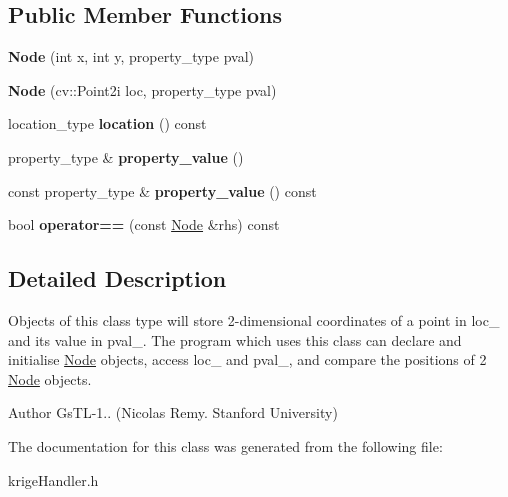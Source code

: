 \subsection*{Public Member Functions}
\begin{DoxyCompactItemize}
\item 
\mbox{\label{classkrige__ce_1_1Node_ab7cf6ac84866959c63ac5da4b4dfb19c}} 
{\bfseries Node} (int x, int y, property\+\_\+type pval)
\item 
\mbox{\label{classkrige__ce_1_1Node_a7a02fb3b97ae4f7472ddf44730dbe788}} 
{\bfseries Node} (cv\+::\+Point2i loc, property\+\_\+type pval)
\item 
\mbox{\label{classkrige__ce_1_1Node_a108c775d615eef2f14f63e2c603c4e60}} 
location\+\_\+type {\bfseries location} () const
\item 
\mbox{\label{classkrige__ce_1_1Node_a2418e7e73c58f5288747419d564de75c}} 
property\+\_\+type \& {\bfseries property\+\_\+value} ()
\item 
\mbox{\label{classkrige__ce_1_1Node_a05fb31d493d66fe8699948681049e03b}} 
const property\+\_\+type \& {\bfseries property\+\_\+value} () const
\item 
\mbox{\label{classkrige__ce_1_1Node_a65b916a73c69103e5ae98b9a2fc8a63c}} 
bool {\bfseries operator==} (const \hyperlink{classkrige__ce_1_1Node}{Node} \&rhs) const
\end{DoxyCompactItemize}


\subsection{Detailed Description}
Objects of this class type will store 2-\/dimensional coordinates of a point in loc\+\_\+ and its value in pval\+\_\+. The program which uses this class can declare and initialise \hyperlink{classkrige__ce_1_1Node}{Node} objects, access loc\+\_\+ and pval\+\_\+, and compare the positions of 2 \hyperlink{classkrige__ce_1_1Node}{Node} objects. 

\begin{DoxyAuthor}{Author}
Gs\+T\+L-\/1.. (Nicolas Remy. Stanford University) 
\end{DoxyAuthor}


The documentation for this class was generated from the following file\+:\begin{DoxyCompactItemize}
\item 
krige\+Handler.\+h\end{DoxyCompactItemize}
